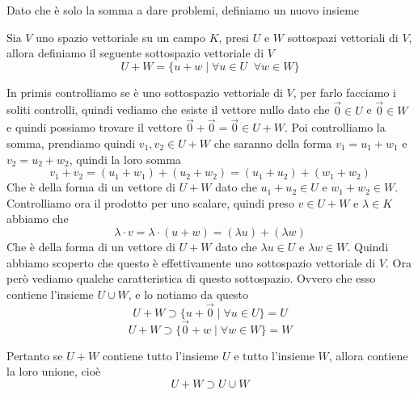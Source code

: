 \documentclass{rapport}
\begin{document}
Dato che è solo la somma a dare problemi, definiamo un nuovo insieme 
\begin{definizione}{}{}
  Sia $V$ uno spazio vettoriale su un campo $K$, presi $U$ e $W$ sottospazi vettoriali di $V$, allora definiamo il seguente sottospazio vettoriale di $V$
  \[
  U+W = \{u + w \;|\; \forall u \in U\;\; \forall w \in W\}
  \]
\end{definizione}

In primis controlliamo se è uno sottospazio vettoriale di $V$, per farlo facciamo i soliti controlli, quindi vediamo che esiste il vettore nullo dato che $\vec{0} \in U$ e $\vec{0} \in W$ e quindi possiamo trovare il vettore $\vec{0} + \vec{0} = \vec{0} \in U+W$. Poi controlliamo la somma, prendiamo quindi $v_1, v_2 \in U+W$ che saranno della forma $v_1 = u_1+w_1$ e $v_2 = u_2+w_2$, quindi la loro somma
\[
v_1 + v_2 = (u_1+w_1) + (u_2+w_2) = (u_1+u_2) + (w_1+w_2) 
\]
Che è della forma di un vettore di $U+W$ dato che $u_1+u_2 \in U$ e $w_1+w_2 \in W$. Controlliamo ora il prodotto per uno scalare, quindi preso $v \in U+W$ e $\lambda \in K$ abbiamo che
\[
\lambda \cdot v = \lambda \cdot (u+w) = (\lambda u) + (\lambda w)
\]
Che è della forma di un vettore di $U+W$ dato che $\lambda u \in U$ e $\lambda w\in W$. Quindi abbiamo scoperto che questo è effettivamente uno sottospazio vettoriale di $V$. Ora però vediamo qualche caratteristica di questo sottospazio. Ovvero che esso contiene l'insieme $U \cup W$, e lo notiamo da questo 
\[
U+W \supset \{u + \vec{0}\; |\; \forall u \in U \} = U
\]
\[
U+W \supset \{\vec{0} + w\; |\; \forall w \in W\} = W
\]


Pertanto se $U+W$ contiene tutto l'insieme $U$ e tutto l'insieme $W$, allora contiene la loro unione, cioè
\[
U+W \supset U \cup W
\]
\end{document}
